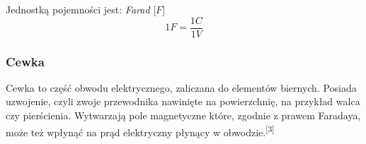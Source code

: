 \documentclass{article}
\begin{document}
        Jednostką pojemności jest: \textit{Farad} [$F$]
        \begin{equation}
          1 F = \frac{1C}{1V}
        \end{equation}

        \fancyfoot[C]{\thepage}
        \pagebreak

      \subsubsection{Cewka}
        Cewka to część obwodu elektrycznego, zaliczana do elementów biernych. Posiada uzwojenie, czyli zwoje przewodnika nawinięte na powierzchnię, na przykład walca czy pierścienia. Wytwarzają pole magnetyczne które, zgodnie z prawem Faradaya, może też wpłynąć na prąd elektryczny płynący w obwodzie.\textsuperscript{[3]}
\end{document}

